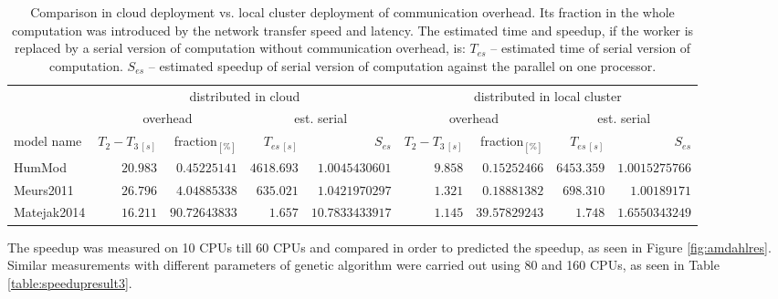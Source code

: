 \begin{table}[ht]
\footnotesize
\begin{tabular}{|l|r|r|r|r|r|r|r|r|}
\hline
& \multicolumn{4}{c|}{distributed in cloud} & \multicolumn{4}{c|}{distributed in local cluster} \\
 & \multicolumn{2}{c|}{overhead} & \multicolumn{2}{c|}{est. serial} & \multicolumn{2}{c|}{overhead} & \multicolumn{2}{c|}{est. serial} \\
model name & $T_2-T_{3~[s]}$ & fraction$_{[\%]}$ & $T_{es~[s]}$ & $S_{es}$ & $T_2-T_{3~[s]}$ & fraction$_{[\%]}$ & $T_{es~[s]}$ & $S_{es}$\\
\hline
HumMod \cite{Kofranek2011hummod} & $\num{20.983}$ & $\num{0.45225141}$ & $\num{4618.693}$ & $\num{1.0045430601}$ & $\num{9.858}$ & $\num{0.15252466}$ & $\num{6453.359}$ & $\num{1.0015275766}$ \\
Meurs2011 \cite{Meurs2011} & $\num{26.796}$ & $\num{4.04885338}$ & $\num{635.021}$ & $\num{1.0421970297}$ & $\num{1.321}$ &  $\num{0.18881382}$ & $\num{698.310}$ &$\num{1.00189171}$\\
Matejak2014\cite{Matejak2014sj} & $\num{16.211}$ & $\num{90.72643833}$ & $\num{1.657}$ & $\num{10.7833433917}$ & $\num{1.145}$ &  $\num{39.57829243}$ & $\num{1.748}$ &$\num{1.6550343249}$\\
\hline
\end{tabular}
\caption{ Comparison in cloud deployment vs. local cluster deployment of communication overhead. Its fraction in the whole computation was introduced by the network transfer speed and latency. The estimated time and speedup, if the worker is replaced by a serial version of computation without communication overhead, is: $T_{es}$ -- estimated time of serial version of computation. $S_{es}$ -- estimated speedup of serial version of computation against the parallel on one processor.}
\label{table:overhead}
\end{table}

The speedup was measured on 10 CPUs till 60 CPUs and compared in order to predicted the speedup, as seen in Figure \ref{fig:amdahlres}. Similar  measurements with different parameters of genetic algorithm were carried out using 80 and 160 CPUs, as seen in Table \ref{table:speedupresult3}.

